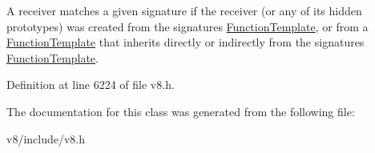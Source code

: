 A receiver matches a given signature if the receiver (or any of its hidden prototypes) was created from the signature\textquotesingle{}s \mbox{\hyperlink{classv8_1_1FunctionTemplate}{Function\+Template}}, or from a \mbox{\hyperlink{classv8_1_1FunctionTemplate}{Function\+Template}} that inherits directly or indirectly from the signature\textquotesingle{}s \mbox{\hyperlink{classv8_1_1FunctionTemplate}{Function\+Template}}. 

Definition at line 6224 of file v8.\+h.



The documentation for this class was generated from the following file\+:\begin{DoxyCompactItemize}
\item 
v8/include/v8.\+h\end{DoxyCompactItemize}
